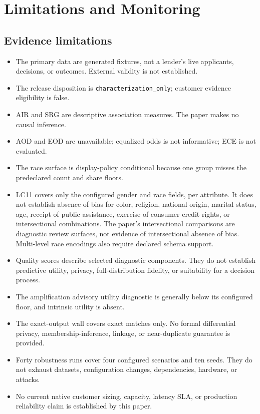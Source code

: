 \section{Limitations and Monitoring}

\subsection{Evidence limitations}

\begin{itemize}
  \item The primary data are generated fixtures, not a lender's live applicants, decisions, or
    outcomes. External validity is not established.
  \item The release disposition is \texttt{characterization\_only}; customer evidence eligibility
    is false.
  \item AIR and SRG are descriptive association measures. The paper makes no causal inference.
  \item AOD and EOD are unavailable; equalized odds is not informative; ECE is not evaluated.
  \item The race surface is display-policy conditional because one group misses the predeclared
    count and share floors.
  \item LC11 covers only the configured gender and race fields, per attribute. It does not establish
    absence of bias for color, religion, national origin, marital status, age, receipt of public
    assistance, exercise of consumer-credit rights, or intersectional combinations. The paper's
    intersectional comparisons are diagnostic review surfaces, not evidence of intersectional
    absence of bias. Multi-level race encodings also require declared schema support.
  \item Quality scores describe selected diagnostic components. They do not establish predictive
    utility, privacy, full-distribution fidelity, or suitability for a decision process.
  \item The amplification advisory utility diagnostic is generally below its configured floor, and
    intrinsic utility is absent.
  \item The exact-output wall covers exact matches only. No formal differential privacy,
    membership-inference, linkage, or near-duplicate guarantee is provided.
  \item Forty robustness runs cover four configured scenarios and ten seeds. They do not exhaust
    datasets, configuration changes, dependencies, hardware, or attacks.
  \item No current native customer sizing, capacity, latency SLA, or production reliability claim
    is established by this paper.
\end{itemize}

